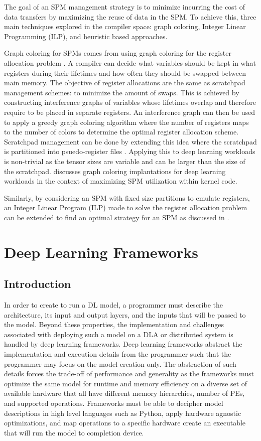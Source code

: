 The goal of an SPM management strategy is to minimize incurring the cost of
data transfers by maximizing the reuse of data in the SPM. To achieve this,
three main techniques explored in the compiler space: graph coloring, Integer
Linear Programming (ILP), and heuristic based approaches.

Graph coloring for SPMs comes from using graph coloring for the register
allocation problem \cite{registerAllocation} \cite{graphColoring}.  A compiler
can decide what variables should be kept in what registers during their
lifetimes and how often they should be swapped between main memory.  The
objective of register allocations are the same as scratchpad management
schemes: to minimize the amount of swaps. This is achieved by constructing
interference graphs of variables whose lifetimes overlap and therefore require
to be placed in separate registers. An interference graph can then be used to
apply a greedy graph coloring algorithm where the number of registers maps to
the number of colors to determine the optimal register allocation scheme.
Scratchpad management can be done by extending this idea where the scratchpad
is partitioned into psuedo-register files \cite{graphColoring}. Applying this
to deep learning workloads is non-trivial as the tensor sizes are variable and
can be larger than the size of the scratchpad. \cite{toplib} discusses graph
coloring implantations for deep learning workloads in the context of maximizing
SPM utilization within kernel code.

Similarly, by considering an SPM with fixed size partitions to emulate registers,
an Integer Linear Program (ILP) made to solve the register allocation problem can
be extended to find an optimal strategy for an SPM as discussed in \cite{verma}.

\section{Deep Learning Frameworks}
\subsection{Introduction}
In order to create to run a DL model, a programmer must describe the
architecture, its input and output layers, and the inputs that will be passed
to the model. Beyond these properties, the implementation and challenges
associated with deploying such a model on a DLA or distributed system is
handled by deep learning frameworks. Deep learning frameworks abstract the
implementation and execution details from the programmer such that the
programmer may focus on the model creation only. The abstraction of such
details forces the trade-off of performance and generality as the frameworks
must optimize the same model for runtime and memory efficiency on a diverse set
of available hardware that all have different memory hierarchies, number of PEs,
and supported operations. Frameworks must be able to decipher model
descriptions in high level languages such as Python, apply hardware agnostic
optimizations, and map operations to a specific hardware create an executable
that will run the model to completion device.

